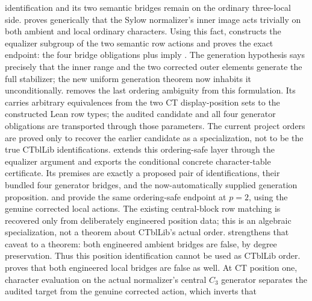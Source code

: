 \documentclass[11pt]{article}
\begin{document}
identification and its two semantic bridges remain on the ordinary
three-local side.
 proves generically that
the Sylow normalizer's inner image acts trivially on both ambient and local
ordinary characters.  Using this fact,
 constructs
the equalizer subgroup of the two semantic row actions and proves the exact
endpoint: the four bridge obligations plus
 imply
.  The generation
hypothesis says precisely that the inner range and the two corrected outer
elements generate the full stabilizer; the new uniform generation theorem
now inhabits it unconditionally.
 removes the
last ordering ambiguity from this formulation.  Its
 carries arbitrary
equivalences from the two CT display-position sets to the constructed Lean
row types; the audited candidate and all four generator obligations are
transported through those parameters.  The current project orders are
proved only to recover the earlier candidate as a specialization, not to
be the true CTblLib identifications.
extends this ordering-safe layer through the equalizer argument and exports
the conditional concrete character-table certificate.  Its premises are
exactly a proposed pair of identifications, their bundled four generator
bridges, and the now-automatically supplied generation proposition.
 and
 provide
the same ordering-safe endpoint at \(p=2\), using the genuine corrected
local actions.  The existing central-block row matching is recovered only
from deliberately engineered position data; this is an algebraic
specialization, not a theorem about CTblLib's actual order.
strengthens that caveat to a theorem: both engineered ambient bridges are
false, by degree preservation.  Thus this position identification cannot
be used as CTblLib order.
 proves that both
engineered local bridges are false as well.  At CT position one, character
evaluation on the actual normalizer's central \(C_3\) generator separates
the audited target from the genuine corrected action, which inverts that
\end{document}
